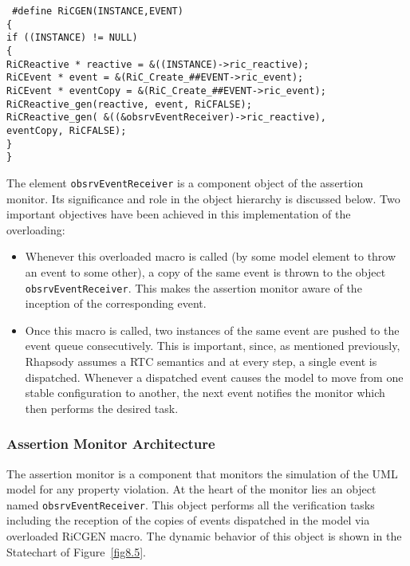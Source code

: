 \vspace{0.1in} 

{\tt
\noindent \#define RiCGEN(INSTANCE,EVENT)\hfill  \\
\{				\hfill  \\
\indent	if ((INSTANCE) != NULL) \hfill  \\
\indent	\{ 			\hfill  \\						\indent \indent	RiCReactive * reactive = \&((INSTANCE)->ric\_reactive);	\hfill  \\
\indent \indent	RiCEvent * event = \&(RiC\_Create\_\#\#EVENT->ric\_event);\hfill  \\
\indent \indent	RiCEvent * eventCopy = \&(RiC\_Create\_\#\#EVENT->ric\_event);\hfill  \\
\indent \indent RiCReactive\_gen(reactive, event, RiCFALSE);\hfill  \\
\indent \indent	RiCReactive\_gen( \&((\&obsrvEventReceiver)->ric\_reactive), \hfill \\ 
\indent \indent \indent \indent \indent \indent \hfill eventCopy, RiCFALSE);	 \\
\indent	\}	\hfill \\
\}\\
}

\noindent
The element {\tt obsrvEventReceiver} is a component object of the assertion 
monitor. Its 
significance and role in the object hierarchy is discussed below.
Two important objectives have been achieved in this 
implementation of the overloading:

\begin{itemize}
\item Whenever this overloaded macro is called (by some model
element to throw an event to some other), a copy of the same event is
thrown to the object {\tt obsrvEventReceiver}. This makes the assertion 
monitor aware of the inception of the corresponding event.

\item Once this macro is called, two instances of the same event
are pushed to the event queue consecutively. This is important, since, as 
mentioned previously, Rhapsody assumes a RTC semantics and at every step, 
a single event is dispatched. Whenever 
a dispatched event causes the model to move from one stable configuration to 
another, the next event notifies the monitor which then performs the 
desired task. 
\end{itemize}

\subsubsection{Assertion Monitor Architecture}\label{checkArch}
\noindent
The assertion monitor is a component that monitors the simulation 
of the UML model for any property violation. 
At the heart of the monitor lies an object named {\tt obsrvEventReceiver}. 
This object performs all the verification tasks including the 
reception of the copies of events dispatched in the model via overloaded 
RiCGEN macro. The dynamic behavior of this object is shown in the Statechart 
of Figure~\ref{fig8.5}.


